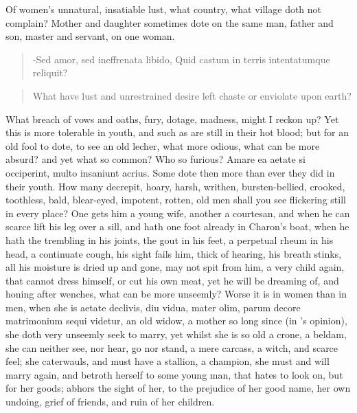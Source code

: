 Of women's unnatural, insatiable lust, what country, what village
doth not complain? Mother and daughter sometimes dote on the same man,
father and son, master and servant, on one woman.

\begin{latin}
\begin{verse}%
-Sed amor, sed ineffrenata libido,
Quid castum in terris intentatumque reliquit?
\end{verse}%
\end{latin}
\translationrule%
\begin{verse}%
What have lust and unrestrained desire
left chaste or enviolate upon earth?
\end{verse}%

What breach of vows and oaths, fury, dotage, madness, might I reckon
up? Yet this is more tolerable in youth, and such as are still in their
hot blood; but for an old fool to dote, to see an old lecher, what more
odious, what can be more absurd? and yet what so common? Who so
furious? Amare ea aetate si occiperint, multo insaniunt acrius.
Some dote then more than ever they did in their youth. How many
decrepit, hoary, harsh, writhen, bursten-bellied, crooked, toothless,
bald, blear-eyed, impotent, rotten, old men shall you see flickering
still in every place? One gets him a young wife, another a courtesan,
and when he can scarce lift his leg over a sill, and hath one foot
already in Charon's boat, when he hath the trembling in his joints, the
gout in his feet, a perpetual rheum in his head, a continuate cough,
his sight fails him, thick of hearing, his breath stinks, all his
moisture is dried up and gone, may not spit from him, a very child
again, that cannot dress himself, or cut his own meat, yet he will be
dreaming of, and honing after wenches, what can be more unseemly? Worse
it is in women than in men, when she is aetate declivis, diu vidua,
mater olim, parum decore matrimonium sequi videtur, an old widow, a
mother so long since (in \Pliny{}'s opinion), she doth very unseemly
seek to marry, yet whilst she is so old a crone, a beldam, she
can neither see, nor hear, go nor stand, a mere carcass, a witch,
and scarce feel; she caterwauls, and must have a stallion, a champion,
she must and will marry again, and betroth herself to some young man,
that hates to look on, but for her goods; abhors the sight of
her, to the prejudice of her good name, her own undoing, grief of
friends, and ruin of her children.

